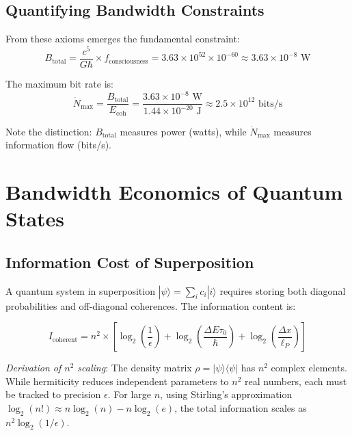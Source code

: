 \documentclass[twocolumn,prd,amsmath,amssymb,aps,superscriptaddress,nofootinbib]{revtex4-2}
\newcommand{\Btotal}{B_{\text{total}}}  %
\newcommand{\Nmax}{\dot{N}_{\text{max}}}  %
\begin{document}
\subsection{Quantifying Bandwidth Constraints}

From these axioms emerges the fundamental constraint:
\begin{equation}
\Btotal = \frac{c^5}{G\hbar} \times f_{\text{consciousness}} = 3.63 \times 10^{52} \times 10^{-60} \approx 3.63 \times 10^{-8} \text{ W}
\label{eq:btotal}
\end{equation}

The maximum bit rate is:
\begin{equation}
\Nmax = \frac{\Btotal}{E_{\text{coh}}} = \frac{3.63 \times 10^{-8} \text{ W}}{1.44 \times 10^{-20} \text{ J}} \approx 2.5 \times 10^{12} \text{ bits/s}
\label{eq:nmax}
\end{equation}

Note the distinction: $\Btotal$ measures power (watts), while $\Nmax$ measures information flow (bits/s).

\section{Bandwidth Economics of Quantum States}
\label{sec:bandwidth}

\subsection{Information Cost of Superposition}

A quantum system in superposition $|\psi\rangle = \sum_i c_i |i\rangle$ requires storing both diagonal probabilities and off-diagonal coherences. The information content is:

\begin{equation}
I_{\text{coherent}} = n^2 \times \left[\log_2\left(\frac{1}{\epsilon}\right) + \log_2\left(\frac{\Delta E \tau_0}{\hbar}\right) + \log_2\left(\frac{\Delta x}{\ell_P}\right)\right]
\label{eq:icoherent}
\end{equation}

\textit{Derivation of $n^2$ scaling}: The density matrix $\rho = |\psi\rangle\langle\psi|$ has $n^2$ complex elements. While hermiticity reduces independent parameters to $n^2$ real numbers, each must be tracked to precision $\epsilon$. For large $n$, using Stirling's approximation $\log_2(n!) \approx n\log_2(n) - n\log_2(e)$, the total information scales as $n^2 \log_2(1/\epsilon)$.
\end{document}
